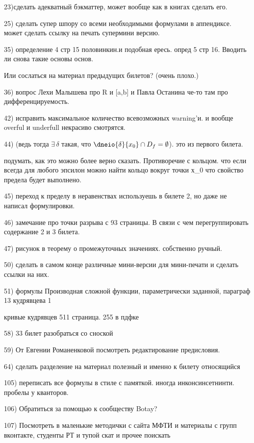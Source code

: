 23)сделать адекватный бэкматтер, может вообще как в книгах сделать его.

25) сделать супер шпору со всеми необходимыми формулами в аппендиксе. может сделать ссылку на печать супермини версию.

35) определение 4 стр 15 половинкин.и подобная ересь.
опред 5 стр 16. Вводить ли снова такие основы основ. 

Или сослаться на материал предыдущих билетов? (очень плохо.)

36) вопрос Лехи Малышева про R и [a,b] и Павла Останина че-то там про дифференцируемость.

42) исправить максимальное количество всевозможных warning'и. и вообще overful и underfull некрасиво смотрятся.

44) (ведь тогда $\exists\, \delta$ такая, что $\dneio{\delta}{x_0}\cap D_f=\emptyset$). это из первого билета.

подумать, как это можно более верно сказать. Противоречие с кольцом. что если всегда для любого эпсилон можно найти кольцо вокруг точки х_0 что свойство предела будет выполнено.

45) переход к пределу в неравенствах используешь в билете 2, но даже не написал формулировки.

46) замечание про точки разрыва с 93 страницы. В связи с чем перегруппировать содержание 2 и 3 билета.

47) рисунок в теорему о промежуточных значениях. собственно ручный.

50) сделать в самом конце различные мини-версии для мини-печати и сделать ссылки на них.

51) формулы Производная сложной функции, параметрически заданной, параграф 13 кудрявцева 1

кривые кудрявцев 511 страница. 255 в пдфке

58) 33 билет разобраться со сноской

59) От Евгении Романенковой посмотреть редактирование предисловия.

64) сделать разделение на материал полезный и именно к билету относящийся

105) переписать все формулы в стиле с памяткой. иногда инконсинсетнинти. пробелы у кванторов. 

106) Обратиться за помощью к сообществу Botay? 

107) Посмотреть в маленькие методички с сайта МФТИ и материалы с групп вконтакте, студенты РТ и тупой скат и прочее поискать

